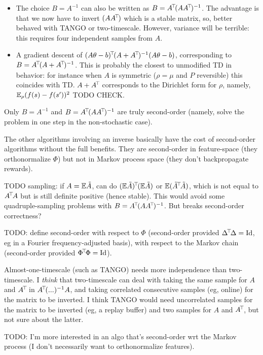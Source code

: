 \documentclass[11pt,a4paper]{article}
\begin{document}
\begin{itemize}
\item The choice $B=A^{-1}$ can also be written as
$B=A^{\!\top}\!(AA^{\!\top}\!)^{-1}$. The advantage is that we now have to
invert $(AA^{\!\top}\!)$ which is a stable matrix, so, better behaved with
TANGO or two-timescale. However, variance
will be terrible: this requires four independent samples from $A$.

\item A gradient descent of
$(A\theta-b)^{\!\top}\!(A+A^{\!\top}\!)^{-1}(A\theta-b)$, corresponding to
$B=A^{\!\top}\!(A+A^{\!\top}\!)^{-1}$. This is probably the closest to
unmodified TD in behavior: for instance when $A$ is symmetric ($\rho=\mu$
and $P$ reversible) this coincides with TD. $A+A^{\!\top}\!$ corresponds to
the Dirichlet form for $\rho$, namely, $\mathbb{E}_{\rho} (f(s)-f(s'))^2$ TODO
CHECK.

\end{itemize}

Only $B=A^{-1}$ and $B=A^{\!\top}\!(AA^{\!\top}\!)^{-1}$ are truly
second-order (namely, solve the problem in one step in the non-stochastic
case).

The other algorithms involving an inverse basically have the cost of
second-order algorithms without the full benefits.  They are second-order
in feature-space (they orthonormalize $\Phi$) but not in Markov process
space (they don't backpropagate rewards).

TODO sampling: if $A=\mathbb{E} \tilde A$, can do $(\mathbb{E} \tilde A)^{\!\top}\!(\mathbb{E}
\tilde A)$ or
$\mathbb{E}(\tilde A^{\!\top}\!\tilde A)$, which is not equal to $A^{\!\top}\!A$ but
is still definite positive (hence stable). This would avoid some
quadruple-sampling problems with $B=A^{\!\top}\!(AA^{\!\top}\!)^{-1}$. But
breaks second-order correctness?

TODO: define second-order with respect to $\Phi$ (second-order
provided $\Delta^{\!\top}\!\Delta=\operatorname{Id}$, eg in a Fourier frequency-adjusted
basis), with respect to the Markov chain (second-order provided
$\Phi^{\!\top}\!\Phi=\operatorname{Id}$).

Almost-one-timescale (such as TANGO) needs more independence than two-timescale. I
\emph{think} that two-timescale can deal with taking the same sample for
$A$ and $A^{\!\top}\!$ in $A^{\!\top}\!(...)^{-1}A$, and taking correlated
consecutive samples (eg, online) for the matrix to be inverted. I think
TANGO would need uncorrelated samples for the matrix to be inverted (eg,
a replay buffer) and two samples for $A$ and $A^{\!\top}\!$, but not sure
about the latter.

TODO: I'm more interested in an algo that's second-order wrt the Markov
process (I don't necessarily want to orthonormalize features).
\end{document}
